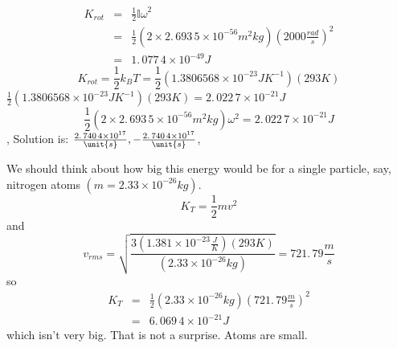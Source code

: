 \documentclass{article}
\begin{document}
\begin{eqnarray*}
K_{rot} &=&\frac{1}{2}\mathbb{I\omega }^{2} \\
&=&\frac{1}{2}\left( 2\times 2.\,\allowbreak 693\,5\times 10^{-56}\unit{m}%
^{2}\unit{kg}\right) \left( 2000\frac{\unit{rad}}{\unit{s}}\right) ^{2} \\
&=&\allowbreak 1.\,\allowbreak 077\,4\times 10^{-49}\unit{J}
\end{eqnarray*}%
\[
K_{rot}=\frac{1}{2}k_{B}T=\frac{1}{2}\left( 1.3806568\times 10^{-23}\unit{J}%
\unit{K}^{-1}\right) \left( 293\unit{K}\right) 
\]%
$\frac{1}{2}\left( 1.3806568\times 10^{-23}\unit{J}\unit{K}^{-1}\right)
\left( 293\unit{K}\right) =\allowbreak 2.\,\allowbreak 022\,7\times 10^{-21}%
\unit{J}$%
\[
\frac{1}{2}\left( 2\times 2.\,\allowbreak 693\,5\times 10^{-56}\unit{m}^{2}%
\unit{kg}\right) \mathbb{\omega }^{2}=\allowbreak 2.\,\allowbreak
022\,7\times 10^{-21}\unit{J}
\]%
, Solution is: $\frac{2.\,\allowbreak 740\,4\times 10^{17}}{\unit{s}},-\frac{%
2.\,\allowbreak 740\,4\times 10^{17}}{\unit{s}}\allowbreak $,

\bigskip 

We should think about how big this energy would be for a single particle,
say, nitrogen atoms $\left( m=2.33\times 10^{-26}\unit{kg}\right) $. 
\[
K_{T}=\frac{1}{2}mv^{2}
\]%
and%
\[
v_{rms}=\sqrt{\frac{3\left( 1.381\times 10^{-23}\frac{\unit{J}}{\unit{K}}%
\right) \left( 293\unit{K}\right) }{\left( 2.33\times 10^{-26}\unit{kg}%
\right) }}=721.\,\allowbreak 79\frac{\unit{m}}{\unit{s}}
\]%
so%
\begin{eqnarray*}
K_{T} &=&\frac{1}{2}\left( 2.33\times 10^{-26}\unit{kg}\right) \left(
721.\,\allowbreak 79\frac{\unit{m}}{\unit{s}}\right) ^{2} \\
&=&\allowbreak 6.\,\allowbreak 069\,4\times 10^{-21}\unit{J}
\end{eqnarray*}%
which isn't very big. That is not a surprise. Atoms are small.
\end{document}
